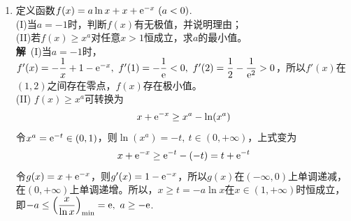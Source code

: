 \begin{enumerate}[label={\textbf{\arabic*.}},leftmargin=
    \inteval{\myenumleftmargin}pt]
\item 定义函数$ f(x)=a\ln x+x+\e^{-x} \ (a<0) $. \\
(I)当$ a=-1 $时，判断$ f(x) $有无极值，并说明理由；\\
(II)若$ f(x)\geq x^a $对任意$ x>1 $恒成立，求$ a $的最小值。\\
\textbf{解}\ (I)当$ a=-1 $时，$ f'(x)=-\dfrac{1}{x}+1-\e^{-x},\ f'(1)=-\dfrac{1}{\e}<0,\ f'(2)=\dfrac{1}{2}-\dfrac{1}{\e^2}>0 $，所以$ f'(x) $在$ (1,2) $之间存在零点，$ f(x) $存在极小值。\\
(II) $ f(x)\geq x^a $可转换为
\begin{gather*}
    x+\mathrm{e}^{-x} \geq x^a -\ln (x^a) 	
\end{gather*}
令$ x^a=\mathrm{e}^{-t}\in (0,1) $，则$ \ln (x^a) =-t,\ t\in(0,+\infty) $，上式变为
\begin{gather*}
    x+\mathrm{e}^{-x} \geq \mathrm{e}^{-t}-(-t)=t+\mathrm{e}^{-t} 
\end{gather*}
令$ g(x)=x+\mathrm{e}^{-x} $，则$ g'(x)=1-\mathrm{e}^{-x} $，所以$ g(x) $在$ (-\infty,0) $上单调递减，在$ (0,+\infty) $上单调递增。所以，$ x\geq t =-a\ln x $在$ x\in(1,+\infty) $时恒成立，即$ -a\leq \left(\dfrac{x}{\ln x}\right)_{\min}=\e,\ a\geq -\e $. 


\end{enumerate}
